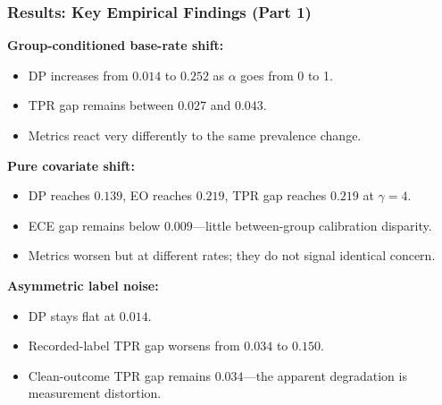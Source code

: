 \documentclass{beamer}
\begin{document}
\begin{frame}
\frametitle{Results: Key Empirical Findings (Part 1)}
\small

\textbf{Group-conditioned base-rate shift:}
\begin{itemize}
    \item DP increases from $0.014$ to $0.252$ as $\alpha$ goes from 0 to 1.
    \item TPR gap remains between $0.027$ and $0.043$.
    \item \alert{Metrics react very differently to the same prevalence change.}
\end{itemize}

\vspace{0.1cm}

\textbf{Pure covariate shift:}
\begin{itemize}
    \item DP reaches $0.139$, EO reaches $0.219$, TPR gap reaches $0.219$ at $\gamma=4$.
    \item ECE gap remains below $0.009$---\alert{little between-group calibration disparity}.
    \item Metrics worsen but at different rates; they do not signal identical concern.
\end{itemize}

\vspace{0.1cm}

\textbf{Asymmetric label noise:}
\begin{itemize}
    \item DP stays flat at $0.014$.
    \item Recorded-label TPR gap worsens from $0.034$ to $0.150$.
    \item Clean-outcome TPR gap remains $0.034$---\alert{the apparent degradation is measurement distortion}.
\end{itemize}

\end{frame}
\end{document}
